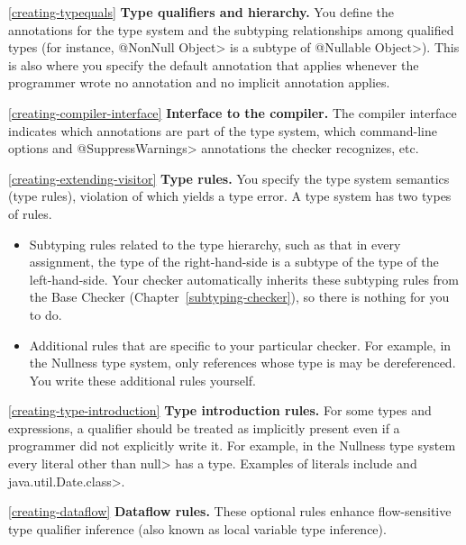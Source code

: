 \begin{description}

\item{\ref{creating-typequals}}
  \textbf{Type qualifiers and hierarchy.}  You define the annotations for
  the type system and the subtyping relationships among qualified types
  (for instance, \<@NonNull Object> is a subtype of \<@Nullable
  Object>).  This is also where you specify the default annotation that
  applies whenever the programmer wrote no annotation and no implicit
  annotation applies.

\item{\ref{creating-compiler-interface}}
  \textbf{Interface to the compiler.}  The compiler interface indicates
  which annotations are part of the type system, which command-line options
  and \<@SuppressWarnings> annotations the checker recognizes, etc.

\item{\ref{creating-extending-visitor}}
  \textbf{Type rules.}  You specify the type system semantics (type
  rules), violation of which yields a type error.  A type system has two types of
  rules.
\begin{itemize}
\item
  Subtyping rules related to the type hierarchy, such as that in every
  assignment,
  the type of the right-hand-side is a subtype of the type of the left-hand-side.
  Your checker automatically inherits these subtyping rules from the Base
  Checker (Chapter~\ref{subtyping-checker}), so there is nothing for you to do.
\item
  Additional rules that are specific to your particular checker.  For
  example, in the Nullness type system, only references whose type is
   may be dereferenced.  You
  write these additional rules yourself.
\end{itemize}

\item{\ref{creating-type-introduction}}
  \textbf{Type introduction rules.}  For some types and
  expressions, a qualifier should be treated as implicitly present even if a
  programmer did not explicitly write it.  For example, in the Nullness
  type system every literal
  other than \<null> has a  type.
  Examples of literals include  and \<java.util.Date.class>.

\item{\ref{creating-dataflow}}
  \textbf{Dataflow rules.}  These optional rules enhance flow-sensitive
  type qualifier inference (also known as local variable type inference).
\end{description}




